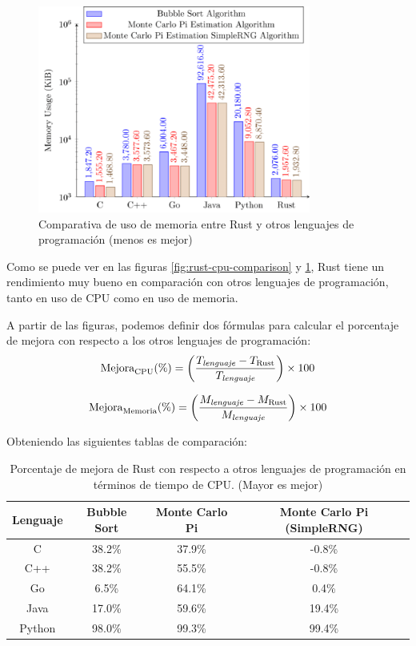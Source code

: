 \begin{figure}[H]
  \centering
  \includegraphics[width=0.8\textwidth]{assets/rust-memory-comparison.png}
  \caption{Comparativa de uso de memoria entre Rust y otros lenguajes de programación (menos es mejor) \parencite{rust-for-safety-and-performance}}
  \label{fig:rust-memory-comparison}
\end{figure}

Como se puede ver en las figuras \ref{fig:rust-cpu-comparison} y \ref{fig:rust-memory-comparison}, Rust tiene un rendimiento muy bueno en comparación con otros lenguajes de programación, tanto en uso de CPU como en uso de memoria.

A partir de las figuras, podemos definir dos fórmulas para calcular el porcentaje de mejora con respecto a los otros lenguajes de programación:
\begin{equation}
    \text{Mejora}_{\text{CPU}} (\%) = \left( \frac{T_{\text{\textit{lenguaje}}} - T_{\text{Rust}}}{T_{\text{\textit{lenguaje}}}} \right) \times 100
\end{equation}

\begin{equation}
    \text{Mejora}_{\text{Memoria}} (\%) = \left( \frac{M_{\text{\textit{lenguaje}}} - M_{\text{Rust}}}{M_{\text{\textit{lenguaje}}}} \right) \times 100
\end{equation}


Obteniendo las siguientes tablas de comparación:

\begin{table}[h!]
\centering
\begin{tabular}{|c|c|c|c|}
\hline
\textbf{Lenguaje} & \textbf{Bubble Sort} & \textbf{Monte Carlo Pi} & \textbf{Monte Carlo Pi (SimpleRNG)} \\
\hline
C      & 38.2\%  & 37.9\%  & -0.8\% \\
C++    & 38.2\%  & 55.5\%  & -0.8\% \\
Go     & 6.5\%   & 64.1\%  & 0.4\%           \\
Java   & 17.0\%  & 59.6\%  & 19.4\%          \\
Python & 98.0\%  & 99.3\%  & 99.4\%          \\
\hline
\end{tabular}
\caption{Porcentaje de mejora de Rust con respecto a otros lenguajes de programación en términos de tiempo de CPU. (Mayor es mejor)}
\end{table}


